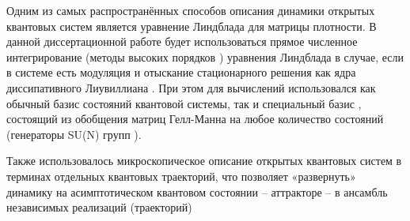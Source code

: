 {\methods} 
Одним из самых распространённых способов описания динамики открытых квантовых систем является уравнение Линдблада \autocite{Lindblad1976, Gorini1976, book2007} для матрицы плотности.
В данной диссертационной работе будет использоваться прямое численное интегрирование (методы высоких порядков \autocite{Lambert1991}) уравнения Линдблада в случае, если в системе есть модуляция и отыскание стационарного решения как ядра диссипативного Лиувиллиана \autocite{Hartmann2017, Nation2015}. При этом для вычислений использовался как обычный базис состояний квантовой системы, так и специальный базис \cite{Liniov2019}, состоящий из обобщения матриц Гелл-Манна \autocite{GellMann1962} на любое количество состояний \autocite{Lendi1987} (генераторы SU(N) групп \autocite{Georgi2018}).

Также использовалось микроскопическое описание открытых квантовых систем в терминах отдельных квантовых траекторий, что позволяет «развернуть» динамику на асимптотическом квантовом состоянии – аттракторе – в ансамбль независимых реализаций (траекторий) \autocite{Dalibard1992, Dum1992, Plenio1998, Volokitin2017}

